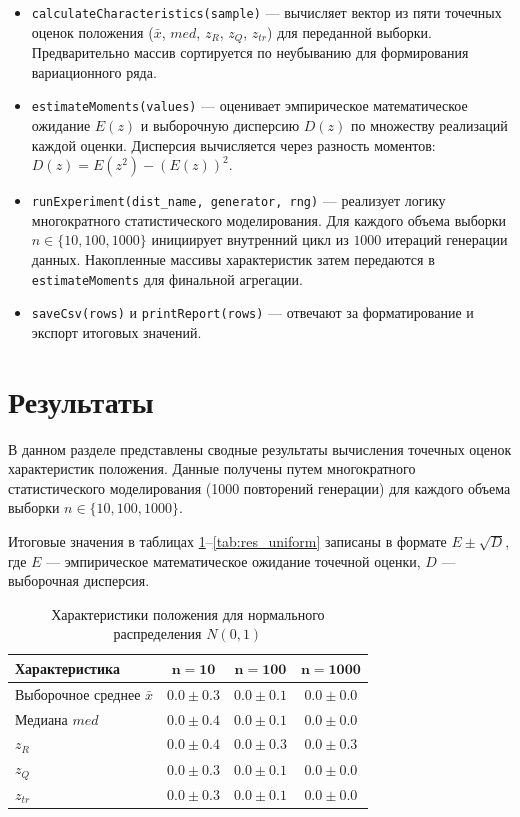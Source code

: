 \documentclass[a4paper, 14pt]{extarticle}
\begin{document}
\begin{itemize}
    \item \texttt{calculateCharacteristics(sample)} — вычисляет вектор из пяти точечных оценок положения ($\bar{x}$, $med$, $z_R$, $z_Q$, $z_{tr}$) для переданной выборки. Предварительно массив сортируется по неубыванию для формирования вариационного ряда. 
    \item \texttt{estimateMoments(values)} — оценивает эмпирическое математическое ожидание $E(z)$ и выборочную дисперсию $D(z)$ по множеству реализаций каждой оценки. Дисперсия вычисляется через разность моментов: $D(z) = E(z^2) - (E(z))^2$.
    \item \texttt{runExperiment(dist\_name, generator, rng)} — реализует логику многократного статистического моделирования. Для каждого объема выборки $n \in \{10, 100, 1000\}$ инициирует внутренний цикл из $1000$ итераций генерации данных. Накопленные массивы характеристик затем передаются в \texttt{estimateMoments} для финальной агрегации.
    \item \texttt{saveCsv(rows)} и \texttt{printReport(rows)} — отвечают за форматирование и экспорт итоговых значений.
\end{itemize}

\section{Результаты}

В данном разделе представлены сводные результаты вычисления точечных оценок характеристик положения. Данные получены путем многократного статистического моделирования (1000 повторений генерации) для каждого объема выборки $n \in \{10, 100, 1000\}$. 

Итоговые значения в таблицах \ref{tab:res_norm}--\ref{tab:res_uniform} записаны в формате $E \pm \sqrt{D}$, где $E$ — эмпирическое математическое ожидание точечной оценки, $D$ — выборочная дисперсия.

\begin{table}[H]
    \centering
    \caption{Характеристики положения для нормального распределения $N(0, 1)$}
    \label{tab:res_norm}
    \begin{tabular}{|l|c|c|c|}
        \hline
        \textbf{Характеристика} & $\mathbf{n=10}$ & $\mathbf{n=100}$ & $\mathbf{n=1000}$ \\ \hline
        Выборочное среднее $\bar{x}$ & $0.0 \pm 0.3$ & $0.0 \pm 0.1$ & $0.0 \pm 0.0$ \\ \hline
        Медиана $med$ & $0.0 \pm 0.4$ & $0.0 \pm 0.1$ & $0.0 \pm 0.0$ \\ \hline
        $z_R$ & $0.0 \pm 0.4$ & $0.0 \pm 0.3$ & $0.0 \pm 0.3$ \\ \hline
        $z_Q$ & $0.0 \pm 0.3$ & $0.0 \pm 0.1$ & $0.0 \pm 0.0$ \\ \hline
        $z_{tr}$ & $0.0 \pm 0.3$ & $0.0 \pm 0.1$ & $0.0 \pm 0.0$ \\ \hline
    \end{tabular}
\end{table}
\end{document}
